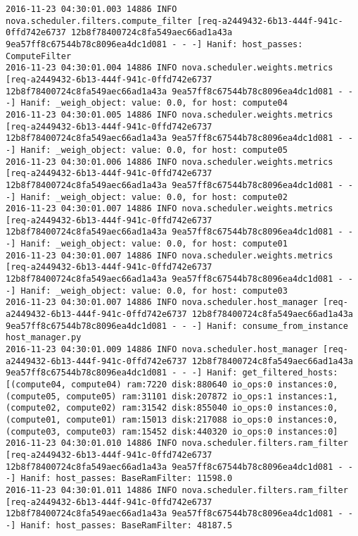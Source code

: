 \begin{lstlisting}[frame=single, caption={The filter scheduler log trace for 10 virtual instances}, label={lst:filterschedulercodetracelog10vi}, escapechar=|]
2016-11-23 04:30:01.003 14886 INFO nova.scheduler.filters.compute_filter [req-a2449432-6b13-444f-941c-0ffd742e6737 12b8f78400724c8fa549aec66ad1a43a 9ea57ff8c67544b78c8096ea4dc1d081 - - -] Hanif: host_passes: ComputeFilter
2016-11-23 04:30:01.004 14886 INFO nova.scheduler.weights.metrics [req-a2449432-6b13-444f-941c-0ffd742e6737 12b8f78400724c8fa549aec66ad1a43a 9ea57ff8c67544b78c8096ea4dc1d081 - - -] Hanif: _weigh_object: value: 0.0, for host: compute04
2016-11-23 04:30:01.005 14886 INFO nova.scheduler.weights.metrics [req-a2449432-6b13-444f-941c-0ffd742e6737 12b8f78400724c8fa549aec66ad1a43a 9ea57ff8c67544b78c8096ea4dc1d081 - - -] Hanif: _weigh_object: value: 0.0, for host: compute05
2016-11-23 04:30:01.006 14886 INFO nova.scheduler.weights.metrics [req-a2449432-6b13-444f-941c-0ffd742e6737 12b8f78400724c8fa549aec66ad1a43a 9ea57ff8c67544b78c8096ea4dc1d081 - - -] Hanif: _weigh_object: value: 0.0, for host: compute02
2016-11-23 04:30:01.007 14886 INFO nova.scheduler.weights.metrics [req-a2449432-6b13-444f-941c-0ffd742e6737 12b8f78400724c8fa549aec66ad1a43a 9ea57ff8c67544b78c8096ea4dc1d081 - - -] Hanif: _weigh_object: value: 0.0, for host: compute01
2016-11-23 04:30:01.007 14886 INFO nova.scheduler.weights.metrics [req-a2449432-6b13-444f-941c-0ffd742e6737 12b8f78400724c8fa549aec66ad1a43a 9ea57ff8c67544b78c8096ea4dc1d081 - - -] Hanif: _weigh_object: value: 0.0, for host: compute03
2016-11-23 04:30:01.007 14886 INFO nova.scheduler.host_manager [req-a2449432-6b13-444f-941c-0ffd742e6737 12b8f78400724c8fa549aec66ad1a43a 9ea57ff8c67544b78c8096ea4dc1d081 - - -] Hanif: consume_from_instance host_manager.py
2016-11-23 04:30:01.009 14886 INFO nova.scheduler.host_manager [req-a2449432-6b13-444f-941c-0ffd742e6737 12b8f78400724c8fa549aec66ad1a43a 9ea57ff8c67544b78c8096ea4dc1d081 - - -] Hanif: get_filtered_hosts: [(compute04, compute04) ram:7220 disk:880640 io_ops:0 instances:0, (compute05, compute05) ram:31101 disk:207872 io_ops:1 instances:1, (compute02, compute02) ram:31542 disk:855040 io_ops:0 instances:0, (compute01, compute01) ram:15013 disk:217088 io_ops:0 instances:0, (compute03, compute03) ram:15452 disk:440320 io_ops:0 instances:0]
2016-11-23 04:30:01.010 14886 INFO nova.scheduler.filters.ram_filter [req-a2449432-6b13-444f-941c-0ffd742e6737 12b8f78400724c8fa549aec66ad1a43a 9ea57ff8c67544b78c8096ea4dc1d081 - - -] Hanif: host_passes: BaseRamFilter: 11598.0
2016-11-23 04:30:01.011 14886 INFO nova.scheduler.filters.ram_filter [req-a2449432-6b13-444f-941c-0ffd742e6737 12b8f78400724c8fa549aec66ad1a43a 9ea57ff8c67544b78c8096ea4dc1d081 - - -] Hanif: host_passes: BaseRamFilter: 48187.5

\end{lstlisting}
